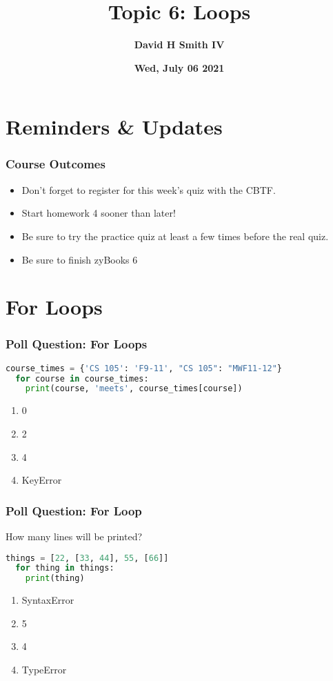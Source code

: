 \documentclass{beamer}
\title{\textbf{Topic 6: Loops}}
\author{\textbf{David H Smith IV}}
\institute[\textbf{UIUC}]{\textbf{University of Illinois Urbana-Champaign}}
\date{\textbf{Wed, July 06 2021}}
\begin{document}
\frame{\titlepage}

\section{Reminders \& Updates}

%
%
\begin{frame}
  \frametitle{Course Outcomes}
  \begin{itemize}
    \item Don't forget to register for this week's quiz with the CBTF.
    \item Start homework 4 sooner than later! 
    \item Be sure to try the practice quiz at least a few times before the real quiz.
    \item Be sure to finish zyBooks 6
  \end{itemize}
\end{frame}

\section{For Loops}

%
%
\begin{frame}[fragile]
  \frametitle{Poll Question: For Loops}

  \begin{lstlisting}[language=Python, autogobble]
  course_times = {'CS 105': 'F9-11', "CS 105": "MWF11-12"}
  for course in course_times:
    print(course, 'meets', course_times[course])
  \end{lstlisting}
  \vfill
  \begin{enumerate}[A]
    \item 0
    \item 2
    \item 4
    \item KeyError
  \end{enumerate}
\end{frame}

%
%
\begin{frame}[fragile]
  \frametitle{Poll Question: For Loop}
  How many lines will be printed?
  \begin{lstlisting}[language=Python, autogobble]
  things = [22, [33, 44], 55, [66]]
  for thing in things:
    print(thing)
  \end{lstlisting}
  \vfill
  \begin{enumerate}[A]
    \item SyntaxError
    \item 5
    \item 4
    \item TypeError
  \end{enumerate}
\end{frame}
\end{document}
